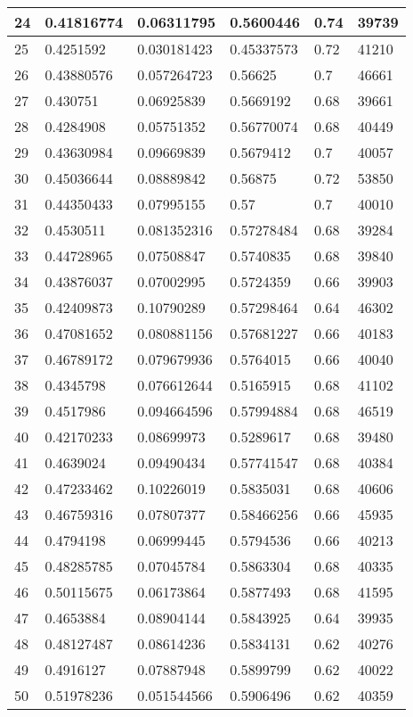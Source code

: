 \begin{longtable}{|l|l|l|l|l|l|}
24 & 0.41816774 & 0.06311795 & 0.5600446 & 0.74 & 39739 \\ \hline 
25 & 0.4251592 & 0.030181423 & 0.45337573 & 0.72 & 41210 \\ \hline 
26 & 0.43880576 & 0.057264723 & 0.56625 & 0.7 & 46661 \\ \hline 
27 & 0.430751 & 0.06925839 & 0.5669192 & 0.68 & 39661 \\ \hline 
28 & 0.4284908 & 0.05751352 & 0.56770074 & 0.68 & 40449 \\ \hline 
29 & 0.43630984 & 0.09669839 & 0.5679412 & 0.7 & 40057 \\ \hline 
30 & 0.45036644 & 0.08889842 & 0.56875 & 0.72 & 53850 \\ \hline 
31 & 0.44350433 & 0.07995155 & 0.57 & 0.7 & 40010 \\ \hline 
32 & 0.4530511 & 0.081352316 & 0.57278484 & 0.68 & 39284 \\ \hline 
33 & 0.44728965 & 0.07508847 & 0.5740835 & 0.68 & 39840 \\ \hline 
34 & 0.43876037 & 0.07002995 & 0.5724359 & 0.66 & 39903 \\ \hline 
35 & 0.42409873 & 0.10790289 & 0.57298464 & 0.64 & 46302 \\ \hline 
36 & 0.47081652 & 0.080881156 & 0.57681227 & 0.66 & 40183 \\ \hline 
37 & 0.46789172 & 0.079679936 & 0.5764015 & 0.66 & 40040 \\ \hline 
38 & 0.4345798 & 0.076612644 & 0.5165915 & 0.68 & 41102 \\ \hline 
39 & 0.4517986 & 0.094664596 & 0.57994884 & 0.68 & 46519 \\ \hline 
40 & 0.42170233 & 0.08699973 & 0.5289617 & 0.68 & 39480 \\ \hline 
41 & 0.4639024 & 0.09490434 & 0.57741547 & 0.68 & 40384 \\ \hline 
42 & 0.47233462 & 0.10226019 & 0.5835031 & 0.68 & 40606 \\ \hline 
43 & 0.46759316 & 0.07807377 & 0.58466256 & 0.66 & 45935 \\ \hline 
44 & 0.4794198 & 0.06999445 & 0.5794536 & 0.66 & 40213 \\ \hline 
45 & 0.48285785 & 0.07045784 & 0.5863304 & 0.68 & 40335 \\ \hline 
46 & 0.50115675 & 0.06173864 & 0.5877493 & 0.68 & 41595 \\ \hline 
47 & 0.4653884 & 0.08904144 & 0.5843925 & 0.64 & 39935 \\ \hline 
48 & 0.48127487 & 0.08614236 & 0.5834131 & 0.62 & 40276 \\ \hline 
49 & 0.4916127 & 0.07887948 & 0.5899799 & 0.62 & 40022 \\ \hline 
50 & 0.51978236 & 0.051544566 & 0.5906496 & 0.62 & 40359 \\ \hline 
\end{longtable}